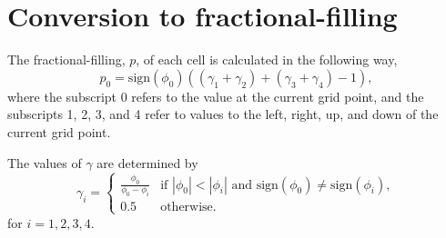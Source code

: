 \documentclass{article}
\begin{document}
\section{Conversion to fractional-filling}
The fractional-filling, $p$, of each cell is calculated in the following way,
\begin{equation}
    p_0 = \text{sign}(\phi_0)  ((\gamma_1 + \gamma_2) + (\gamma_3 + \gamma_4) - 1),
\end{equation}
where the subscript 0 refers to the value at the current grid point, and the subscripts 1, 2, 3, and 4 refer to values to the left, right, up, and down of the current grid point. 

The values of $\gamma$ are determined by
\begin{equation}
    \gamma_i = 
    \begin{cases}
        \frac{\phi_0}{\phi_0 - \phi_i} & 
            \text{if } |\phi_0| < |\phi_i| \text{ and } 
            \text{sign}(\phi_0) \ne \text{sign}(\phi_i), \\
        0.5 & \text{otherwise}.
    \end{cases}
\end{equation}
for $i = 1,2,3,4$.
\end{document}

